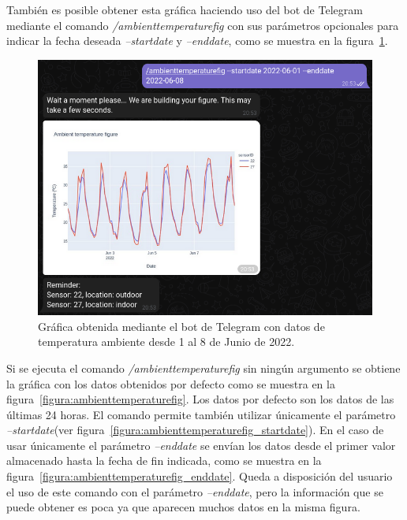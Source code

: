 \documentclass[a4paper, 12pt, oneside]{book}
\begin{document}
También es posible obtener esta gráfica haciendo uso del bot de Telegram mediante el comando \textit{/ambienttemperaturefig} con sus parámetros opcionales para indicar la fecha deseada \textit{--startdate} y \textit{--enddate}, como se muestra en la figura~\ref{figura:telegram_ambient_temperature_01_08_junio}.
\begin{figure}[H]
	\centering
    \includegraphics[width=12cm, keepaspectratio]{img/telegram_ambient_temperature_01_08_junio}
    \caption{Gráfica obtenida mediante el bot de Telegram con datos de temperatura ambiente desde 1 al 8 de Junio de 2022.}
    \label{figura:telegram_ambient_temperature_01_08_junio}
\end{figure}

Si se ejecuta el comando \textit{/ambienttemperaturefig} sin ningún argumento se obtiene la gráfica con los datos obtenidos por defecto como se muestra en la figura~\ref{figura:ambienttemperaturefig}. Los datos por defecto son los datos de las últimas 24 horas. El comando permite también utilizar únicamente el parámetro \textit{--startdate}(ver figura~\ref{figura:ambienttemperaturefig_startdate}). En el caso de usar únicamente el parámetro \textit{--enddate} se envían los datos desde el primer valor almacenado hasta la fecha de fin indicada, como se muestra en la figura~\ref{figura:ambienttemperaturefig_enddate}. Queda a disposición del usuario el uso de este comando con el parámetro \textit{--enddate}, pero la información que se puede obtener es poca ya que aparecen muchos datos en la misma figura.
\end{document}
